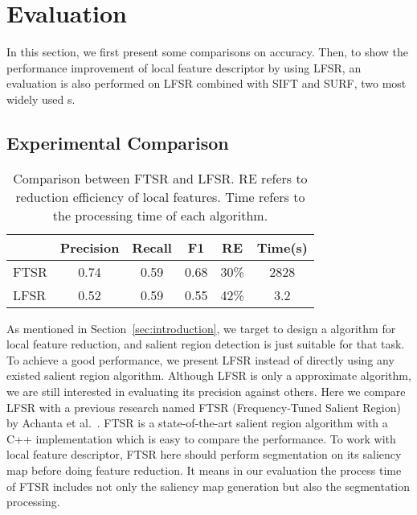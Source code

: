 \section{Evaluation}
\label{sec:evaluation}

In this section, we first present some comparisons on accuracy. Then, to show the performance improvement of local feature descriptor by using LFSR, an evaluation is also performed on LFSR combined with SIFT and SURF, two most widely used {\lfea}s.

\subsection{Experimental Comparison}
\label{sec:evaluation_comparison}

\begin{table}[!t]
\begin{center}
\begin{tabular}{|l|c|c|c|c|c|}
\hline
 & Precision & Recall & F1 & RE & Time(s) \\
\hline\hline
FTSR & 0.74 & 0.59 & 0.68 & 30\% & 2828 \\
LFSR & 0.52 & 0.59 & 0.55 & 42\% & 3.2 \\
\hline
\end{tabular}
\end{center}
\caption{Comparison between FTSR and LFSR. RE refers to reduction efficiency of local features. Time refers to the processing time of each algorithm.}
\label{tab:comparison}
\end{table}

As mentioned in Section~\ref{sec:introduction}, we target to design a algorithm for local feature reduction, and salient region detection is just suitable for that task. To achieve a good performance, we present LFSR instead of directly using any existed salient region algorithm. Although LFSR is only a approximate algorithm, we are still interested in evaluating its precision against others. Here we compare LFSR with a previous research named FTSR (Frequency-Tuned Salient Region) by Achanta et al.~\cite{achanta2009frequency}. FTSR is a state-of-the-art salient region algorithm with a C++ implementation which is easy to compare the performance. To work with local feature descriptor, FTSR here should perform segmentation on its saliency map before doing feature reduction. It means in our evaluation the process time of FTSR includes not only the saliency map generation but also the segmentation processing.

